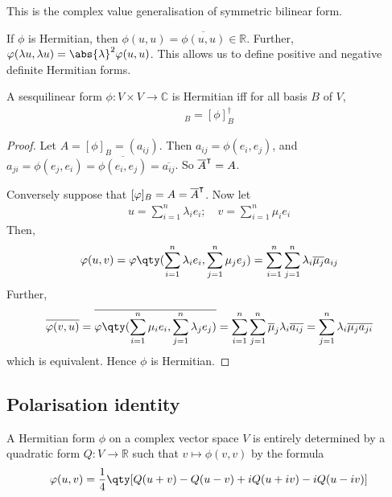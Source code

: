 This is the complex value generalisation of symmetric bilinear form.

\begin{remark}
	If $\phi$ is Hermitian, then $\phi(u,u) = \overline{\phi(u,u)} \in \mathbb R$.
	Further, $\phi(\lambda u, \lambda u) = \abs{\lambda}^2 \phi(u,u)$.
	This allows us to define positive and negative definite Hermitian forms.
\end{remark}

\begin{lemma}
	A sesquilinear form $\phi \colon V \times V \to \mathbb C$ is Hermitian iff for all basis $B$ of $V$,
	\begin{align*}
		[\phi]_B = [\phi]_B^\dagger
	\end{align*}
\end{lemma}

\begin{proof}
	Let $A = [\phi]_B = (a_{ij})$.
	Then $a_{ij} = \phi(e_i, e_j)$, and $a_{ji} = \phi(e_j, e_i) = \overline{\phi(e_i, e_j)} = \overline{a_{ij}}$.
	So $\overline A^\intercal = A$.

	Conversely suppose that $[\varphi]_B = A = \overline A^\intercal$.
	Now let
	\begin{align*}
		u = \sum_{i=1}^n \lambda_i e_i;\quad v = \sum_{i=1}^n \mu_i e_i
	\end{align*}
	Then,
	\begin{align*}
		\phi(u,v) = \phi\qty(\sum_{i=1}^n \lambda_i e_i, \sum_{j=1}^n \mu_j e_j) = \sum_{i=1}^n \sum_{j=1}^n \lambda_i \overline{\mu_j} a_{ij}
	\end{align*}
	Further,
	\begin{align*}
		\overline{\phi(v,u)} = \overline{\phi\qty(\sum_{i=1}^n \mu_i e_i, \sum_{j=1}^n \lambda_j e_j)} = \sum_{i=1}^n \sum_{j=1}^n \overline \mu_j \lambda_i \overline{a_{ij}} = \sum_{j=1}^n \lambda_i \overline{\mu_j} \overline{a_{ji}}
	\end{align*}
	which is equivalent.
	Hence $\phi$ is Hermitian.
\end{proof}

\subsection{Polarisation identity}
A Hermitian form $\phi$ on a complex vector space $V$ is entirely determined by a quadratic form $Q \colon V \to \mathbb R$ such that $v \mapsto \phi(v,v)$ by the formula
\begin{align*}
	\phi(u,v) = \frac{1}{4} \qty[ Q(u+v) - Q(u-v) + iQ(u+iv) - iQ(u-iv) ]
\end{align*}

